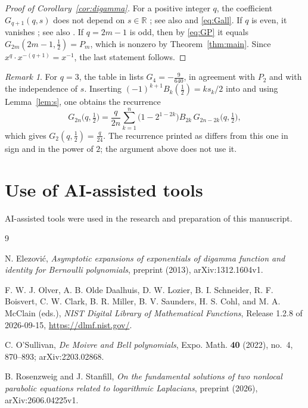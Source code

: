 \documentclass[11pt]{amsart}
\theoremstyle{definition}
\theoremstyle{remark}
\newtheorem{remark}[theorem]{Remark}
\numberwithin{equation}{section}
\begin{document}
\begin{proof}[Proof of Corollary~\ref{cor:digamma}]
For a positive integer $q$, the coefficient $G_{q+1}(q,s)$ does not depend on $s\in\mathbb{R}$ \cite[Theorem~3.1]{E}; see also \cite[Proposition~2.4]{RS} and \eqref{eq:Gall}. If $q$ is even, it vanishes \cite[Theorem~3.2]{E}; see also \cite[Corollary~2.5]{RS}. If $q=2m-1$ is odd, then by \eqref{eq:GP} it equals $G_{2m}(2m-1,\frac12)=P_m$, which is nonzero by Theorem~\ref{thm:main}. Since $x^q\cdot x^{-(q+1)}=x^{-1}$, the last statement follows.
\end{proof}

\begin{remark}
For $q=3$, the table in \cite[p.~4]{E} lists $G_4=-\frac9{640}$, in agreement with $P_2$ and with the independence of $s$. Inserting $(-1)^{k+1}B_k(\frac12)=k s_k/2$ into \cite[Theorem~2.3]{E} and using Lemma~\ref{lem:s}, one obtains the recurrence
\[
  G_{2n}\bigl(q,\tfrac12\bigr)=\frac q{2n}\sum_{k=1}^n\bigl(1-2^{1-2k}\bigr)B_{2k}\,G_{2n-2k}\bigl(q,\tfrac12\bigr),
\]
which gives $G_2(q,\frac12)=\frac q{24}$. The recurrence printed as \cite[(4.1)]{E} differs from this one in sign and in the power of $2$; the argument above does not use it.
\end{remark}

\section*{Use of AI-assisted tools}

AI-assisted tools were used in the research and preparation of this manuscript.

\begin{thebibliography}{9}

N. Elezovi\'c, \emph{Asymptotic expansions of exponentials of digamma function and identity for Bernoulli polynomials}, preprint (2013), arXiv:1312.1604v1.

F. W. J. Olver, A. B. Olde Daalhuis, D. W. Lozier, B. I. Schneider, R. F. Boisvert, C. W. Clark, B. R. Miller, B. V. Saunders, H. S. Cohl, and M. A. McClain (eds.), \emph{NIST Digital Library of Mathematical Functions}, Release 1.2.8 of 2026-09-15, \url{https://dlmf.nist.gov/}.

C. O'Sullivan, \emph{De Moivre and Bell polynomials}, Expo. Math. \textbf{40} (2022), no.~4, 870--893; arXiv:2203.02868.

B. Rosenzweig and J. Stanfill, \emph{On the fundamental solutions of two nonlocal parabolic equations related to logarithmic Laplacians}, preprint (2026), arXiv:2606.04225v1.

\end{thebibliography}
\end{document}
